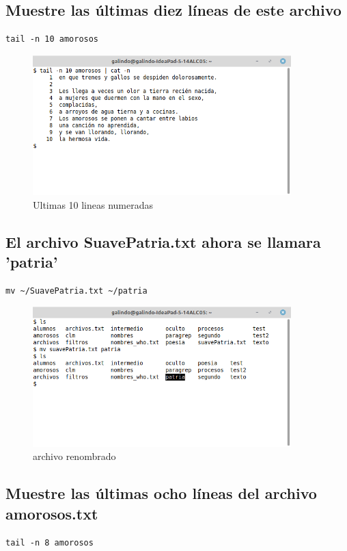 \documentclass[11pt]{article}
\begin{document}
\subsection{Muestre las últimas diez líneas de este archivo}
\label{sec:org92abbb8}
\begin{verbatim}
tail -n 10 amorosos
\end{verbatim}

\begin{figure}[htbp]
\centering
\includegraphics[width=10cm]{img/a12.png}
\caption{Ultimas 10 lineas numeradas}
\end{figure}

\pagebreak

\subsection{El archivo SuavePatria.txt ahora se llamara 'patria'}
\label{sec:org401e5f2}
\begin{verbatim}
mv ~/SuavePatria.txt ~/patria
\end{verbatim}

\begin{figure}[htbp]
\centering
\includegraphics[width=10cm]{img/a13.png}
\caption{archivo renombrado}
\end{figure}

\subsection{Muestre las últimas ocho líneas del archivo amorosos.txt}
\label{sec:orgf261610}
\begin{verbatim}
tail -n 8 amorosos 
\end{verbatim}
\end{document}
